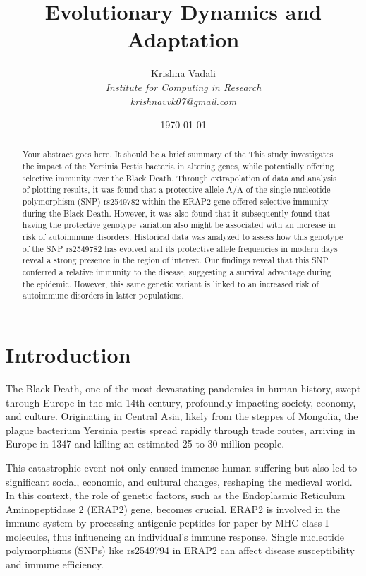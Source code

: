 \documentclass[a4paper, 12pt]{article}
\title{Evolutionary Dynamics and Adaptation}
\author{Krishna Vadali\\
        \textit{Institute for Computing in Research} \\
        \textit{krishnavvk07@gmail.com}}
\date{\today}
\begin{document}
\maketitle

\begin{abstract}
Your abstract goes here. It should be a brief summary of the This study investigates the impact of the Yersinia Pestis bacteria in altering genes, while potentially offering selective immunity over the Black Death. Through extrapolation of data and analysis of plotting results, it was found that a protective allele A/A of the single nucleotide polymorphism (SNP) rs2549782 within the ERAP2 gene offered selective immunity during the Black Death. However, it was also found that it subsequently found that having the protective genotype variation also might be associated with an increase in risk of autoimmune disorders. Historical data was analyzed to assess how this genotype of the SNP rs2549782 has evolved and its protective allele frequencies in modern days reveal a strong presence in the region of interest. Our findings reveal that this SNP conferred a relative immunity to the disease, suggesting a survival advantage during the epidemic. However, this same genetic variant is linked to an increased risk of autoimmune disorders in latter populations. 
\end{abstract}

\section{Introduction}
The Black Death, one of the most devastating pandemics in human history, swept through Europe in the mid-14th century, profoundly impacting society, economy, and culture. Originating in Central Asia, likely from the steppes of Mongolia, the plague bacterium Yersinia pestis spread rapidly through trade routes, arriving in Europe in 1347 and killing an estimated 25 to 30 million people. 

This catastrophic event not only caused immense human suffering but also led to significant social, economic, and cultural changes, reshaping the medieval world. In this context, the role of genetic factors, such as the Endoplasmic Reticulum Aminopeptidase 2 (ERAP2) gene, becomes crucial. ERAP2 is involved in the immune system by processing antigenic peptides for paper by MHC class I molecules, thus influencing an individual's immune response. Single nucleotide polymorphisms (SNPs) like rs2549794 in ERAP2 can affect disease susceptibility and immune efficiency.
\end{document}
